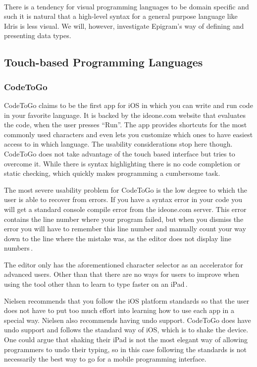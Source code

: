 \paragraph{}

There is a tendency for visual programming languages to be domain specific and such it is natural that a high-level syntax for a general purpose language like Idris is less visual. We will, however, investigate Epigram's way of defining and presenting data types.

\subsection{Touch-based Programming Languages}


\subsubsection{CodeToGo}
CodeToGo claims to be the first app for iOS in which you can write and run code in your favorite language. It is backed by the ideone.com website that evaluates the code, when the user presses “Run”. The app provides shortcuts for the most commonly used characters and even lets you customize which ones to have easiest access to in which language. The usability considerations stop here though. CodeToGo does not take advantage of the touch based interface but tries to overcome it. While there is syntax highlighting there is no code completion or static checking, which quickly makes programming a cumbersome task.

The most severe usability problem for CodeToGo is the low degree to which the user is able to recover from errors. If you have a syntax error in your code you will get a standard console compile error from the ideone.com server. This error contains the line number where your program failed, but when you dismiss the error you will have to remember this line number and manually count your way down to the line where the mistake was, as the editor does not display line numbers\,\cite{nielsen1990heuristic}.

The editor only has the aforementioned character selector as an accelerator for advanced users. Other than that there are no ways for users to improve when using the tool other than to learn to type faster on an iPad\,\cite{nielsen1990heuristic}.

Nielsen  recommends that you follow the iOS platform standards so that the user does not have to put too much effort into learning how to use each app in a special way. Nielsen also recommends having undo support. CodeToGo does have undo support and follows the standard way of iOS, which is to shake the device. One could argue that shaking their iPad is not the most elegant way of allowing programmers to undo their typing, so in this case following the standards is not necessarily the best way to go for a mobile programming interface.

